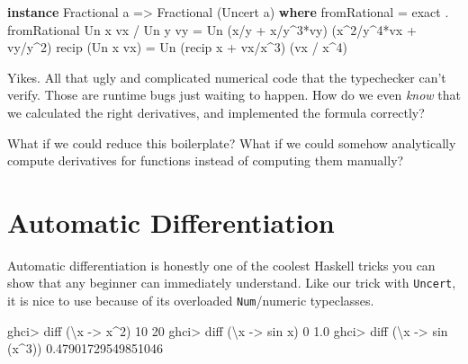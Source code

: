\documentclass[]{article}
\newenvironment{Shaded}{}{}
\newcommand{\KeywordTok}[1]{\textcolor[rgb]{0.00,0.44,0.13}{\textbf{{#1}}}}
\newcommand{\DataTypeTok}[1]{\textcolor[rgb]{0.56,0.13,0.00}{{#1}}}
\newcommand{\DecValTok}[1]{\textcolor[rgb]{0.25,0.63,0.44}{{#1}}}
\newcommand{\FloatTok}[1]{\textcolor[rgb]{0.25,0.63,0.44}{{#1}}}
\newcommand{\OtherTok}[1]{\textcolor[rgb]{0.00,0.44,0.13}{{#1}}}
\newcommand{\FunctionTok}[1]{\textcolor[rgb]{0.02,0.16,0.49}{{#1}}}
\newcommand{\NormalTok}[1]{{#1}}
\begin{document}
\begin{Shaded}
\begin{Highlighting}[]
\KeywordTok{instance} \DataTypeTok{Fractional} \NormalTok{a }\OtherTok{=>} \DataTypeTok{Fractional} \NormalTok{(}\DataTypeTok{Uncert} \NormalTok{a) }\KeywordTok{where}
    \NormalTok{fromRational      }\FunctionTok{=} \NormalTok{exact }\FunctionTok{.} \NormalTok{fromRational}
    \DataTypeTok{Un} \NormalTok{x vx }\FunctionTok{/} \DataTypeTok{Un} \NormalTok{y vy }\FunctionTok{=} \DataTypeTok{Un} \NormalTok{(x}\FunctionTok{/}\NormalTok{y }\FunctionTok{+} \NormalTok{x}\FunctionTok{/}\NormalTok{y}\FunctionTok{^}\DecValTok{3}\FunctionTok{*}\NormalTok{vy)   (x}\FunctionTok{^}\DecValTok{2}\FunctionTok{/}\NormalTok{y}\FunctionTok{^}\DecValTok{4}\FunctionTok{*}\NormalTok{vx }\FunctionTok{+} \NormalTok{vy}\FunctionTok{/}\NormalTok{y}\FunctionTok{^}\DecValTok{2}\NormalTok{)}
    \NormalTok{recip (}\DataTypeTok{Un} \NormalTok{x vx)   }\FunctionTok{=} \DataTypeTok{Un} \NormalTok{(recip x }\FunctionTok{+} \NormalTok{vx}\FunctionTok{/}\NormalTok{x}\FunctionTok{^}\DecValTok{3}\NormalTok{) (vx }\FunctionTok{/} \NormalTok{x}\FunctionTok{^}\DecValTok{4}\NormalTok{)}
\end{Highlighting}
\end{Shaded}

Yikes. All that ugly and complicated numerical code that the typechecker
can't verify. Those are runtime bugs just waiting to happen. How do we
even \emph{know} that we calculated the right derivatives, and
implemented the formula correctly?

What if we could reduce this boilerplate? What if we could somehow
analytically compute derivatives for functions instead of computing them
manually?

\section{Automatic Differentiation}\label{automatic-differentiation}

Automatic differentiation is honestly one of the coolest Haskell tricks
you can show that any beginner can immediately understand. Like our
trick with \texttt{Uncert}, it is nice to use because of its overloaded
\texttt{Num}/numeric typeclasses.

\begin{Shaded}
\begin{Highlighting}[]
\NormalTok{ghci}\FunctionTok{>} \NormalTok{diff (\textbackslash{}x }\OtherTok{->} \NormalTok{x}\FunctionTok{^}\DecValTok{2}\NormalTok{) }\DecValTok{10}
\DecValTok{20}
\NormalTok{ghci}\FunctionTok{>} \NormalTok{diff (\textbackslash{}x }\OtherTok{->} \NormalTok{sin x) }\DecValTok{0}
\FloatTok{1.0}
\NormalTok{ghci}\FunctionTok{>} \NormalTok{diff (\textbackslash{}x }\OtherTok{->} \NormalTok{sin (x}\FunctionTok{^}\DecValTok{3}\NormalTok{))}
\FloatTok{0.47901729549851046}
\end{Highlighting}
\end{Shaded}
\end{document}

